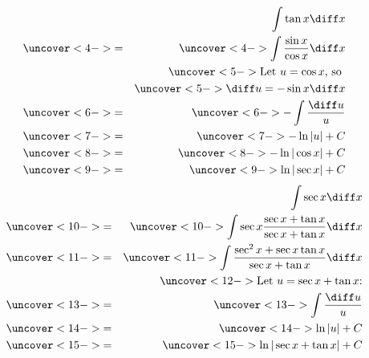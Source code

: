 \begin{frame}
{\begin{columns}[t]
\abovedisplayskip=0pt
\belowdisplayskip=0pt
\begin{eqnarray*}
& & \int \tan x \diff x\\
& \uncover<4->{ = } & %
\uncover<4->{\int \frac{\sin x}{\cos x}\diff x}\\
& & \uncover<5->{\textrm{Let $u = \cos x$, so }}\\
& & \uncover<5->{\diff u = -\sin x \diff x}\\
& \uncover<6->{ = } & %
\uncover<6->{-\int \frac{\diff u}{u}}\\
& \uncover<7->{ = } & %
\uncover<7->{-\ln |u| + C}\\
& \uncover<8->{ = } & %
\uncover<8->{-\ln |\cos x| + C}\\
& \uncover<9->{ = } & %
\uncover<9->{\ln |\sec x| + C}\\
\end{eqnarray*}
\abovedisplayskip=0pt
\belowdisplayskip=0pt
\begin{eqnarray*}
& & \int \sec x \diff x\\
& \uncover<10->{ = } & %
\uncover<10->{\int \sec x\frac{\sec x + \tan x}{\sec x + \tan x}\diff x}\\
& \uncover<11->{ = } & %
\uncover<11->{\int \frac{\sec^2 x + \sec x \tan x}{\sec x + \tan x}\diff x}\\
& & \uncover<12->{\textrm{Let $u = \sec x + \tan x$:}}\\
& \uncover<13->{ = } & %
\uncover<13->{\int \frac{\diff u}{u}}\\
& \uncover<14->{ = } & %
\uncover<14->{\ln |u| + C}\\
& \uncover<15->{ = } & %
\uncover<15->{\ln |\sec x + \tan x| + C}\\
\end{eqnarray*}
\end{columns}
}%
\end{frame}
